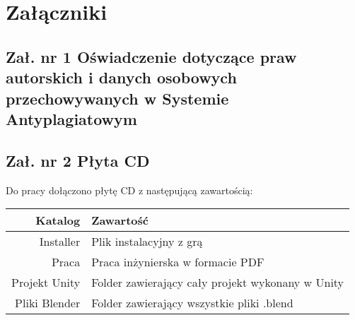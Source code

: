 \chapter*{Załączniki}
\section*{Zał. nr 1  Oświadczenie dotyczące praw autorskich i danych osobowych przechowywanych w Systemie Antyplagiatowym}

\section*{Zał. nr 2 Płyta CD}
\centering
Do pracy dołączono płytę CD z następującą zawartością: 
\hfill \break
\hfill \break
\begin{tabular}{|r|l|} \hline
Katalog & Zawartość \\ \hline
Installer & Plik instalacyjny z grą \\
Praca & Praca inżynierska w formacie PDF \\
Projekt Unity & Folder zawierający cały projekt wykonany w Unity \\
Pliki Blender & Folder zawierający wszystkie pliki .blend \\ \hline

\end{tabular}



